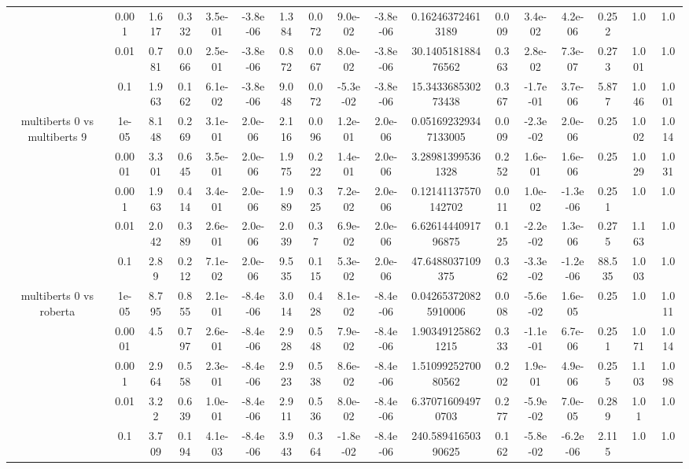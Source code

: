\begin{tabular}{|c|c|c|c|c|c|c|c|c|c|c|c|c|c|c|c|c|}
 & 0.001 & 1.617 & 0.332 & 3.5e-01 & -3.8e-06 & 1.384 & 0.072 & 9.0e-02 & -3.8e-06 & 0.162463724613189 & 0.009 & 3.4e-02 & 4.2e-06 & 0.252 & 1.0 & 1.0 \\
 & 0.01 & 0.781 & 0.066 & 2.5e-01 & -3.8e-06 & 0.872 & 0.067 & 8.0e-02 & -3.8e-06 & 30.140518188476562 & 0.363 & 2.8e-02 & 7.3e-07 & 0.273 & 1.001 & 1.0 \\
 & 0.1 & 1.963 & 0.162 & 6.1e-02 & -3.8e-06 & 9.048 & 0.072 & -5.3e-02 & -3.8e-06 & 15.343368530273438 & 0.367 & -1.7e-01 & 3.7e-06 & 5.877 & 1.046 & 1.001 \\
\hline
\multirow{5}{*}{multiberts 0 vs multiberts 9} & 1e-05 & 8.148 & 0.269 & 3.1e-01 & 2.0e-06 & 2.116 & 0.096 & 1.2e-01 & 2.0e-06 & 0.051692329347133005 & 0.009 & -2.3e-02 & 2.0e-06 & 0.25 & 1.002 & 1.014 \\
 & 0.0001 & 3.301 & 0.645 & 3.5e-01 & 2.0e-06 & 1.975 & 0.222 & 1.4e-01 & 2.0e-06 & 3.289813995361328 & 0.252 & 1.6e-01 & 1.6e-06 & 0.25 & 1.029 & 1.031 \\
 & 0.001 & 1.963 & 0.414 & 3.4e-01 & 2.0e-06 & 1.989 & 0.325 & 7.2e-02 & 2.0e-06 & 0.12141137570142702 & 0.011 & 1.0e-02 & -1.3e-06 & 0.251 & 1.0 & 1.0 \\
 & 0.01 & 2.042 & 0.389 & 2.6e-01 & 2.0e-06 & 2.039 & 0.37 & 6.9e-02 & 2.0e-06 & 6.6261444091796875 & 0.125 & -2.2e-02 & 1.3e-06 & 0.275 & 1.163 & 1.0 \\
 & 0.1 & 2.89 & 0.212 & 7.1e-02 & 2.0e-06 & 9.535 & 0.115 & 5.3e-02 & 2.0e-06 & 47.6488037109375 & 0.362 & -3.3e-02 & -1.2e-06 & 88.535 & 1.003 & 1.0 \\
\hline
\multirow{5}{*}{multiberts 0 vs roberta } & 1e-05 & 8.795 & 0.855 & 2.1e-01 & -8.4e-06 & 3.014 & 0.428 & 8.1e-02 & -8.4e-06 & 0.042653720825910006 & 0.008 & -5.6e-02 & 1.6e-05 & 0.25 & 1.0 & 1.011 \\
 & 0.0001 & 4.5 & 0.797 & 2.6e-01 & -8.4e-06 & 2.928 & 0.548 & 7.9e-02 & -8.4e-06 & 1.903491258621215 & 0.333 & -1.1e-01 & 6.7e-06 & 0.251 & 1.071 & 1.014 \\
 & 0.001 & 2.964 & 0.558 & 2.3e-01 & -8.4e-06 & 2.923 & 0.538 & 8.6e-02 & -8.4e-06 & 1.5109925270080562 & 0.202 & 1.9e-01 & 4.9e-06 & 0.255 & 1.103 & 1.098 \\
 & 0.01 & 3.22 & 0.639 & 1.0e-01 & -8.4e-06 & 2.911 & 0.536 & 8.0e-02 & -8.4e-06 & 6.370716094970703 & 0.277 & -5.9e-02 & 7.0e-05 & 0.289 & 1.01 & 1.0 \\
 & 0.1 & 3.709 & 0.194 & 4.1e-03 & -8.4e-06 & 3.943 & 0.364 & -1.8e-02 & -8.4e-06 & 240.58941650390625 & 0.162 & -5.8e-02 & -6.2e-06 & 2.115 & 1.0 & 1.0 \\

\end{tabular}

